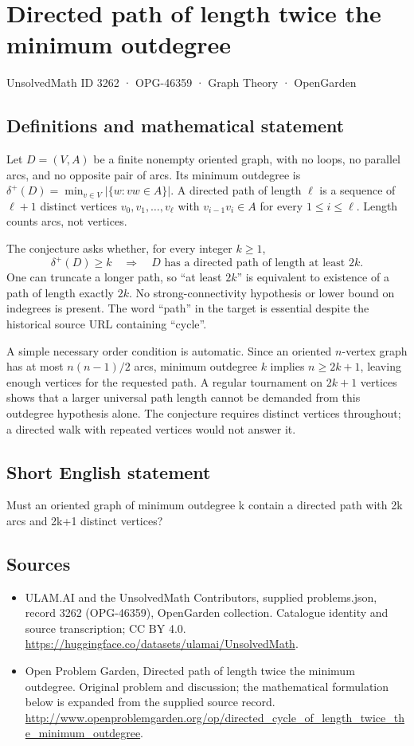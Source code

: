 \documentclass[11pt,a4paper]{article}
\begin{document}
\section*{Directed path of length twice the minimum outdegree}\label{3262}
{\small UnsolvedMath ID 3262 · OPG-46359 · Graph Theory · OpenGarden}
\subsection{Definitions and mathematical statement}
Let $D=(V,A)$ be a finite nonempty oriented graph, with no loops, no
parallel arcs, and no opposite pair of arcs. Its minimum outdegree is
$\delta^+(D)=\min_{v\in V}|\{w:vw\in A\}|$. A directed path of length
$\ell$ is a sequence of $\ell+1$ distinct vertices
$v_0,v_1,\ldots,v_\ell$ with $v_{i-1}v_i\in A$ for every
$1\le i\le\ell$. Length counts arcs, not vertices.

The conjecture asks whether, for every integer $k\ge1$,
\[
       \delta^+(D)\ge k
       \quad\Longrightarrow\quad
       D\text{ has a directed path of length at least }2k.
\]
One can truncate a longer path, so ``at least $2k$'' is equivalent to
existence of a path of length exactly $2k$. No strong-connectivity
hypothesis or lower bound on indegrees is present. The word ``path''
in the target is essential despite the historical source URL containing
``cycle''.

A simple necessary order condition is automatic. Since an oriented
$n$-vertex graph has at most $n(n-1)/2$ arcs, minimum outdegree $k$
implies $n\ge2k+1$, leaving enough vertices for the requested path.
A regular tournament on $2k+1$ vertices shows that a larger universal
path length cannot be demanded from this outdegree hypothesis alone.
The conjecture requires distinct vertices throughout; a directed walk
with repeated vertices would not answer it.
\subsection{Short English statement}
Must an oriented graph of minimum outdegree k contain a directed path with 2k arcs and 2k+1 distinct vertices?
\subsection{Sources}
\begin{itemize}
\item[S1] ULAM.AI and the UnsolvedMath Contributors, supplied problems.json, record 3262 (OPG-46359), OpenGarden collection. Catalogue identity and source transcription; CC BY 4.0.
\url{https://huggingface.co/datasets/ulamai/UnsolvedMath}.
\item[S2] Open Problem Garden, Directed path of length twice the minimum outdegree. Original problem and discussion; the mathematical formulation below is expanded from the supplied source record.
\url{http://www.openproblemgarden.org/op/directed_cycle_of_length_twice_the_minimum_outdegree}.
\end{itemize}
\end{document}
